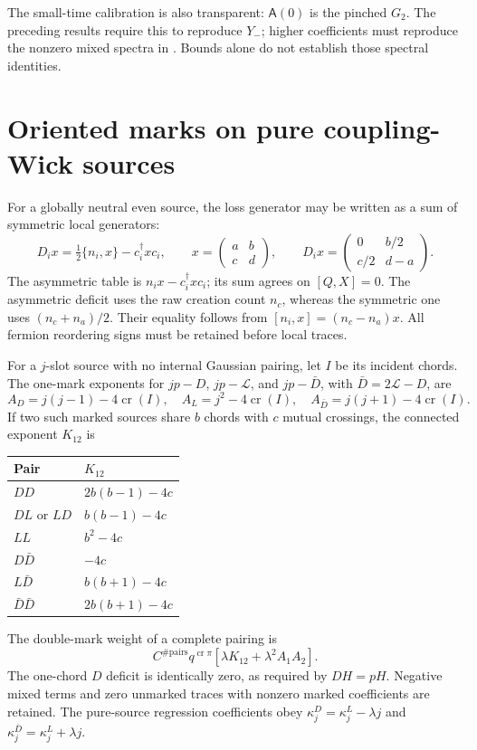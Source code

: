 \documentclass[11pt]{article}
\newcommand{\LL}{\mathcal L}
\newcommand{\crs}{\operatorname{cr}}
\begin{document}
The small-time calibration is also transparent: $\mathsf A(0)$ is the
pinched $G_2$. The preceding results require this to reproduce $Y_-$;
higher coefficients must reproduce the nonzero mixed spectra in
\cite{Two}. Bounds alone do not establish those spectral identities.

\newpage
\section{Oriented marks on pure coupling-Wick sources}
For a globally neutral even source, the loss generator may be written
as a sum of symmetric local generators:
\begin{equation}
 D_i x=\tfrac12\{n_i,x\}-c_i^\dagger xc_i,
 \qquad x=\begin{pmatrix}a&b\\c&d\end{pmatrix},\qquad
 D_i x=\begin{pmatrix}0&b/2\\c/2&d-a\end{pmatrix}.\label{eq:localD}
\end{equation}
The asymmetric table is $n_ix-c_i^\dagger xc_i$; its sum agrees
on $[Q,X]=0$. The asymmetric deficit uses the raw creation count
$n_c$, whereas the symmetric one uses $(n_c+n_a)/2$.
Their equality follows from $[n_i,x]=(n_c-n_a)x$.
All fermion reordering signs must be retained before local traces.

For a $j$-slot source with no internal Gaussian pairing, let $I$ be
its incident chords. The one-mark exponents for $jp-D$, $jp-\LL$,
and $jp-\bar D$, with $\bar D=2\LL-D$, are
\begin{equation}
 A_D=j(j-1)-4\crs(I),\quad
 A_L=j^2-4\crs(I),\quad
 A_{\bar D}=j(j+1)-4\crs(I).\label{eq:pure}
\end{equation}
If two such marked sources share $b$ chords with $c$ mutual crossings,
the connected exponent $K_{12}$ is
\begin{center}
\begin{tabular}{ll}
\toprule Pair & $K_{12}$\\\midrule
$DD$ & $2b(b-1)-4c$\\
$DL$ or $LD$ & $b(b-1)-4c$\\
$LL$ & $b^2-4c$\\
$D\bar D$ & $-4c$\\
$L\bar D$ & $b(b+1)-4c$\\
$\bar D\bar D$ & $2b(b+1)-4c$\\\bottomrule
\end{tabular}
\end{center}
The double-mark weight of a complete pairing is
\begin{equation}
 C^{\#\mathrm{pairs}}q^{\crs\pi}
       [\lambda K_{12}+\lambda^2A_1A_2].\label{eq:pureweight}
\end{equation}
The one-chord $D$ deficit is identically zero, as required by $DH=pH$.
Negative mixed terms and zero unmarked traces with nonzero marked
coefficients are retained. The pure-source regression coefficients
obey $\kappa_j^D=\kappa_j^L-\lambda j$ and
$\kappa_j^{\bar D}=\kappa_j^L+\lambda j$.
\end{document}
